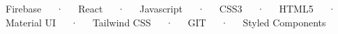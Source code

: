 


\begin{center}
    {\normalsize Firebase~~~·~~~React~~~·~~~Javascript~~~·~~~CSS3~~~·~~~HTML5~~~·~~~Material UI~~~·~~~Tailwind CSS~~~·~~~GIT~~~·~~~Styled Components}
\end{center}

